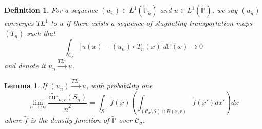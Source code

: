 \documentclass{article}
\newcommand{\abs}[1]{\left \lvert #1 \right \rvert}
\newcommand{\1}{\mathbf{1}}
\newcommand{\cut}{\mathrm{cut}}
\newcommand{\Pbb}{\mathbb{P}}
\newcommand{\Sset}{\mathcal{S}}
\newcommand{\Cset}{\mathcal{C}}
\newcommand{\Csig}{\Cset_{\sigma}}
\newcommand{\wn}{\widetilde{n}}
\newcommand{\wPbb}{\widetilde{\Pbb}}
\newcommand{\wf}{\widetilde{f}}
\theoremstyle{aldenthm}
\newtheorem{lemma}{Lemma}
\newtheorem{definition}{Definition}
\begin{document}
\begin{definition}
	For a sequence $(u_{\wn}) \in L^1(\widetilde{\Pbb}_{\wn})$ and $u \in L^1(\widetilde{\Pbb})$, we say $(u_{\wn})$ converges $TL^1$ to $u$ if there exists a sequence of stagnating transportation maps $(T_{\wn})$ such that
	\begin{equation*}
	\int_{\Csig} \abs{u(x) - (u_{\wn}) \circ T_{\wn}(x)} d\widetilde{\Pbb}(x) \to 0
	\end{equation*}
	and denote it $u_{\wn} \overset{TL^1}{\to} u$.
\end{definition}

\begin{lemma}
	\label{lem: cut_convergence}
	If $(u_{\wn}) \overset{TL^1}{\to} u$, with probability one
	\begin{equation*}
	\lim_{n \to \infty} \frac{\widetilde{\cut}_{n,r}(S_{\wn})}{\wn^2} = \int_{\Sset} \wf(x) \left(\int_{(\Csig \setminus \Sset) \cap B(x,r)} \wf(x') dx' \right) dx
	\end{equation*}
	where $\wf$ is the density function of $\wPbb$ over $\Csig$.
\end{lemma}
\end{document}

